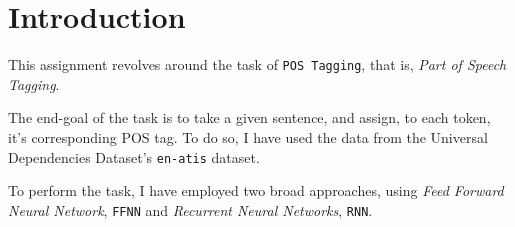 \section*{Introduction}

This assignment revolves around the task of \verb|POS Tagging|, that is, \textit{Part of Speech Tagging}.

The end-goal of the task is to take a given sentence, and assign, to each token, it's corresponding POS tag. To do so, I have used the data from the Universal Dependencies Dataset's \verb|en-atis| dataset. 

To perform the task, I have employed two broad approaches, using \textit{Feed Forward Neural Network}, \verb|FFNN| and \textit{Recurrent Neural Networks}, \verb|RNN|.
